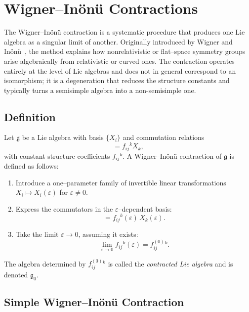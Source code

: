 \section{Wigner--In\"on\"u Contractions}

The Wigner--In\"on\"u contraction is a systematic procedure that produces one Lie
algebra as a singular limit of another.  Originally introduced by Wigner and
In\"on\"u~\cite{InonuWigner1953}, the method explains how nonrelativistic or
flat--space symmetry groups arise algebraically from relativistic or curved
ones.  The contraction operates entirely at the level of Lie algebras and does
not in general correspond to an isomorphism; it is a degeneration that reduces
the structure constants and typically turns a semisimple algebra into a
non-semisimple one.

\subsection{Definition}

Let $\mathfrak{g}$ be a Lie algebra with basis $\{X_i\}$ and commutation
relations
\begin{equation}
   [X_i,X_j] = f_{ij}{}^{k} X_k ,
\end{equation}
with constant structure coefficients $f_{ij}{}^{k}$.  A
Wigner--In\"on\"u contraction of $\mathfrak{g}$ is defined as follows:

\begin{enumerate}
\item Introduce a one--parameter family of invertible linear transformations
      $X_i \mapsto X_i(\varepsilon)$ for $\varepsilon \neq 0$.
\item Express the commutators in the $\varepsilon$--dependent basis:
\begin{equation}
    [X_i(\varepsilon),X_j(\varepsilon)]
        = f_{ij}{}^{k}(\varepsilon) \, X_k(\varepsilon).
\end{equation}
\item Take the limit $\varepsilon \to 0$, assuming it exists:
\begin{equation}
    \lim_{\varepsilon\to 0} f_{ij}{}^{k}(\varepsilon)
        = f^{(0)}_{ij}{}^{k}.
\end{equation}
\end{enumerate}

The algebra determined by $f^{(0)}_{ij}{}^{k}$ is called the
\emph{contracted Lie algebra} and is denoted $\mathfrak{g}_0$.

\subsection{Simple Wigner--In\"on\"u Contraction}

